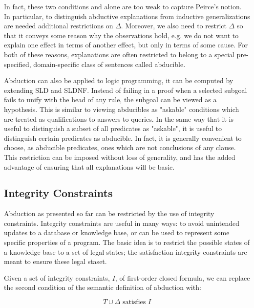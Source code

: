 In fact, these two conditions  and  alone are too weak to capture Peirce's notion. 
In particular, to distinguish abductive explanations from inductive generalizations are needed additional restrictions on $\Delta$.  
Moreover, we also need to restrict $\Delta$ so that it conveys some reason why the observations hold, 
e.g. we do not want to explain one effect in terms of another effect, but only in terms of some cause. 
For both of these reasons, explanations are often restricted to belong to a special pre-specified, domain-specific class of sentences called abducible.

Abduction can also be applied to logic programming, it can be computed by extending SLD and SLDNF.
Instead of failing in a proof when a selected subgoal fails to unify with the head of any rule, the subgoal can be viewed as a hypothesis. 
This is similar to viewing abducibles as "askable" conditions which are treated as qualifications to answers to queries. 
In the same way that it is useful to distinguish a subset of all predicates as "askable", it is useful to distinguish certain predicates as abducible. 
In fact, it is generally convenient to choose, as abducible predicates, ones which are not conclusions of any clause.
This restriction can be imposed without loss of generality, and has the added advantage of ensuring that all explanations will be basic.

\subsection{Integrity Constraints}

Abduction as presented so far can be restricted by the use of integrity constraints. 
Integrity constraints are useful in many ways: to avoid unintended updates to a database or knowledge base,
or can be used to represent some specific properties of a program. 
The basic idea is to restrict the possible states of a knowledge base to a set of legal states; 
the satisfaction integrity constraints are meant to ensure these legal staset.

Given a set of integrity constraints, $I$, of first-order closed formula, 
we can replace the second condition  of the semantic definition of abduction with: 

\begin{equation}
    T \cup \Delta \text{ satisfies } I
    \label{eqn:abl3}
   \end{equation}

